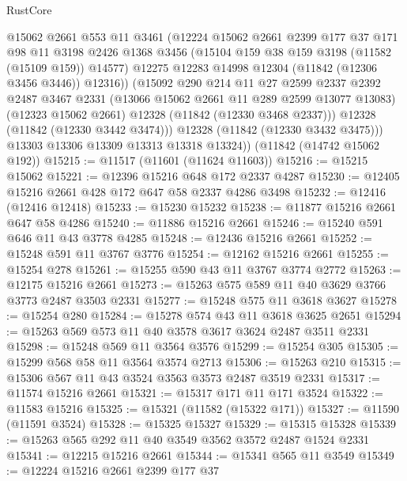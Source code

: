 \begin{lexlean}{RustCore}
\begin{coremodule}
              @15062
              @2661
              @553
              @11
              @3461
              (@12224
                @15062
                @2661
                @2399
                @177
                @37
                @171
                @98
                @11
                @3198
                @2426
                @1368
                @3456
                (@15104 @159 @38 @159 @3198 (@11582 (@15109 @159)) @14577)
                @12275
                @12283
                @14998
                @12304
                (@11842 (@12306 @3456 @3446))
                @12316))
            (@15092
              @290
              @214
              @11
              @27
              @2599
              @2337
              @2392
              @2487
              @3467
              @2331
              (@13066 @15062 @2661 @11 @289 @2599 @13077 @13083)
              (@12323 @15062 @2661)
              @12328
              (@11842 (@12330 @3468 @2337)))
            @12328
            (@11842 (@12330 @3442 @3474)))
          @12328
          (@11842 (@12330 @3432 @3475)))
        @13303
        @13306
        @13309
        @13313
        @13318
        @13324))
    (@11842 (@14742 @15062 @192))
@15215 := @11517 (@11601 (@11624 @11603))
@15216 := @15215 @15062
@15221 := @12396 @15216 @648 @172 @2337 @4287
@15230 := @12405 @15216 @2661 @428 @172 @647 @58 @2337 @4286 @3498
@15232 := @12416 (@12416 @12418)
@15233 := @15230 @15232
@15238 := @11877 @15216 @2661 @647 @58 @4286
@15240 := @11886 @15216 @2661
@15246 := @15240 @591 @646 @11 @43 @3778 @4285
@15248 := @12436 @15216 @2661
@15252 := @15248 @591 @11 @3767 @3776
@15254 := @12162 @15216 @2661
@15255 := @15254 @278
@15261 := @15255 @590 @43 @11 @3767 @3774 @2772
@15263 := @12175 @15216 @2661
@15273 := @15263 @575 @589 @11 @40 @3629 @3766 @3773 @2487 @3503 @2331
@15277 := @15248 @575 @11 @3618 @3627
@15278 := @15254 @280
@15284 := @15278 @574 @43 @11 @3618 @3625 @2651
@15294 := @15263 @569 @573 @11 @40 @3578 @3617 @3624 @2487 @3511 @2331
@15298 := @15248 @569 @11 @3564 @3576
@15299 := @15254 @305
@15305 := @15299 @568 @58 @11 @3564 @3574 @2713
@15306 := @15263 @210
@15315 := @15306 @567 @11 @43 @3524 @3563 @3573 @2487 @3519 @2331
@15317 := @11574 @15216 @2661
@15321 := @15317 @171 @11 @171 @3524
@15322 := @11583 @15216
@15325 := @15321 (@11582 (@15322 @171))
@15327 := @11590 (@11591 @3524)
@15328 := @15325 @15327
@15329 := @15315 @15328
@15339 := @15263 @565 @292 @11 @40 @3549 @3562 @3572 @2487 @1524 @2331
@15341 := @12215 @15216 @2661
@15344 := @15341 @565 @11 @3549
@15349 := @12224 @15216 @2661 @2399 @177 @37

\end{coremodule}
\end{lexlean}
